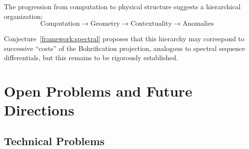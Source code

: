 \documentclass[11pt]{article}
\begin{document}
The progression from computation to physical structure suggests a hierarchical organization: \[\text{Computation} \longrightarrow \text{Geometry} \longrightarrow \text{Contextuality} \longrightarrow \text{Anomalies}\]

Conjecture~\ref{framework:spectral} proposes that this hierarchy may correspond to successive ``costs'' of the Bohrification projection, analogous to spectral sequence differentials, but this remains to be rigorously established.



\section{Open Problems and Future Directions}
\label{open-problems-and-future-directions}

\subsection{Technical Problems}
\label{technical-problems}
\end{document}
